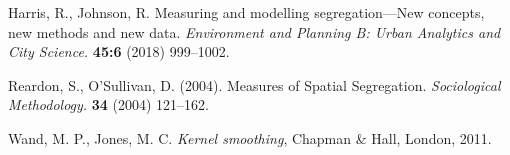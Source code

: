 \documentclass{article}
\theoremstyle{theorem}
\theoremstyle{definition}
\begin{document}
\begin{thebibliography}{1}
Harris, R., Johnson, R. Measuring and modelling segregation---New concepts, new methods and new data. \textit{Environment and Planning B: Urban Analytics and City Science.} \textbf{45:6} (2018) 999--1002.

Reardon, S., O'Sullivan, D. (2004). Measures of Spatial Segregation. \textit{Sociological Methodology.} \textbf{34} (2004) 121--162.

 Wand, M. P., Jones, M. C. \textit{Kernel smoothing}, Chapman \& Hall, London, 2011.

%
\end{thebibliography}

%
\vfill\eject
\end{document}
